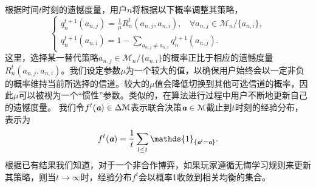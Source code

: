 根据时间$t$时刻的遗憾度量，用户$n$将根据以下概率调整其策略，
\vspace{-0.3cm}
\begin{equation}\label{eq:st1}
\begin{cases}
q^{t+1}_n(a_{n,j})=\frac{1}{\mu}R^t_n(a_{n,j},a_{n,i}), ~~~~\forall a_{n,j}\in\mathcal{M}_n/\{a_{n,i}\}, \\
q^{t+1}_n(a_{n,i})=1-\sum_{a_{n,j}\neq a_{n,i}}q^{t+1}_n(a_{n,j}).
\end{cases}
\end{equation}
这里，选择某一替代策略$a_{n,j}\in\mathcal{M}_n/\{a_{n,i}\}$的概率正比于相应的遗憾度量$R^{t}_n(a_{n,j},a_{n,i})$。我们设定参数$\mu$为一个较大的值，以确保用户始终会以一定非负的概率维持当前所选择的信道。较大的$\mu$值会降低切换到其他可选信道的概率，因此$\mu$可以被视为一个“惯性”参数。类似的，在算法进行过程中用户不断地更新自己的遗憾度量。
我们令$f^t(\emph{\textbf{a}})\in\Delta\mathcal{M}$表示联合决策$\emph{\textbf{a}}\in\mathcal{M}$截止到$t$时刻的经验分布，表示为
\vspace{-0.2cm}
\begin{equation}\label{eq:empi}
f^t(\A)=\frac{1}{t}\sum_{l\leq t}\mathds{1}_{\{\A^l=\A\}}.
\end{equation}
根据已有结果我们知道，对于一个非合作博弈，如果玩家遵循无悔学习规则来更新其策略，则当$t\rightarrow\infty$时，经验分布$f^t$会以概率1收敛到相关均衡的集合\cite{Hart00asimple}。


